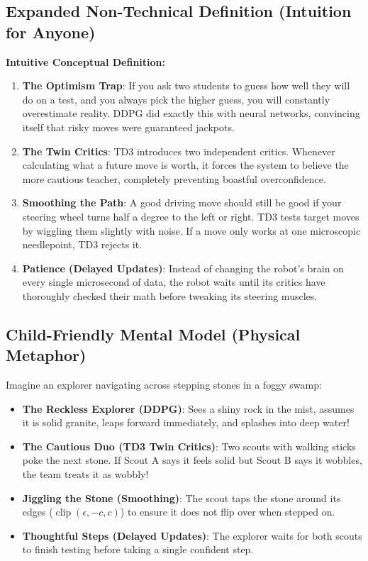 \documentclass[11pt,a4paper]{article}
\theoremstyle{definition}
\begin{document}
\subsection{Expanded Non-Technical Definition (Intuition for Anyone)}
\textbf{Intuitive Conceptual Definition:}
\begin{enumerate}
    \item \textbf{The Optimism Trap}: If you ask two students to guess how well they will do on a test, and you always pick the higher guess, you will constantly overestimate reality. DDPG did exactly this with neural networks, convincing itself that risky moves were guaranteed jackpots.
    \item \textbf{The Twin Critics}: TD3 introduces two independent critics. Whenever calculating what a future move is worth, it forces the system to believe the more cautious teacher, completely preventing boastful overconfidence.
    \item \textbf{Smoothing the Path}: A good driving move should still be good if your steering wheel turns half a degree to the left or right. TD3 tests target moves by wiggling them slightly with noise. If a move only works at one microscopic needlepoint, TD3 rejects it.
    \item \textbf{Patience (Delayed Updates)}: Instead of changing the robot's brain on every single microsecond of data, the robot waits until its critics have thoroughly checked their math before tweaking its steering muscles.
\end{enumerate}

\subsection{Child-Friendly Mental Model (Physical Metaphor)}
Imagine an explorer navigating across stepping stones in a foggy swamp:
\begin{itemize}
    \item \textbf{The Reckless Explorer (DDPG)}: Sees a shiny rock in the mist, assumes it is solid granite, leaps forward immediately, and splashes into deep water!
    \item \textbf{The Cautious Duo (TD3 Twin Critics)}: Two scouts with walking sticks poke the next stone. If Scout A says it feels solid but Scout B says it wobbles, the team treats it as wobbly!
    \item \textbf{Jiggling the Stone (Smoothing)}: The scout taps the stone around its edges ($\operatorname{clip}(\epsilon, -c, c)$) to ensure it does not flip over when stepped on.
    \item \textbf{Thoughtful Steps (Delayed Updates)}: The explorer waits for both scouts to finish testing before taking a single confident step.
\end{itemize}
\end{document}
